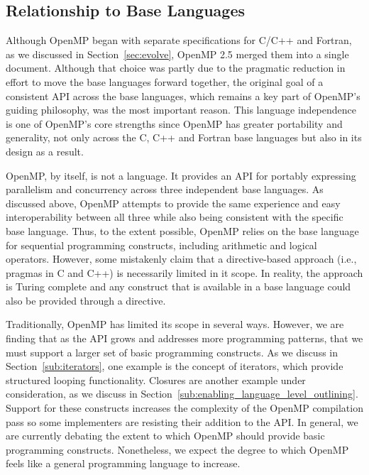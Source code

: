 \subsection{Relationship to Base Languages}
\label{sub:relationship_to_base_languages}

Although OpenMP began with separate specifications for C/C++ and 
Fortran, as we discussed in Section~\ref{sec:evolve}, OpenMP 2.5 
merged them into a single document. Although that choice was
partly due to the pragmatic reduction in effort to move the base 
languages forward together, the original goal of a consistent API 
across the base languages, which remains a key part of OpenMP's 
guiding philosophy, was the most important reason. This language 
independence is one of OpenMP's core strengths since OpenMP has 
greater portability and generality, not only across the C, C++ 
and Fortran base languages but also in its design as a result. 



OpenMP, by itself, is not a language.  It provides an API for portably
expressing parallelism and concurrency across three independent base
languages. As discussed above, OpenMP attempts to provide the same 
experience and easy interoperability between all three while also
being consistent with the specific base language. Thus, to the extent 
possible, OpenMP relies on the base language for sequential programming
constructs, including arithmetic and logical operators. However, some
mistakenly claim that a directive-based approach (i.e., pragmas in
C and C++) is necessarily limited in it scope. In reality, the approach
is Turing complete and any construct that is available in a base language 
could also be provided through a directive. 

Traditionally, OpenMP has limited its scope in several ways. However, we 
are finding that as the API grows and addresses more programming patterns, 
that we must support a larger set of basic programming constructs. As we
discuss in Section~\ref{sub:iterators}, one example is the concept of 
iterators, which provide structured looping functionality. Closures are 
another example under consideration, as we discuss in 
Section~\ref{sub:enabling_language_level_outlining}. Support for these
constructs increases the complexity of the OpenMP compilation pass so
some implementers are resisting their addition to the API. In general, 
we are currently debating the extent to which OpenMP should provide
basic programming constructs. Nonetheless, we expect the degree to
which OpenMP feels like a general programming language to increase.


